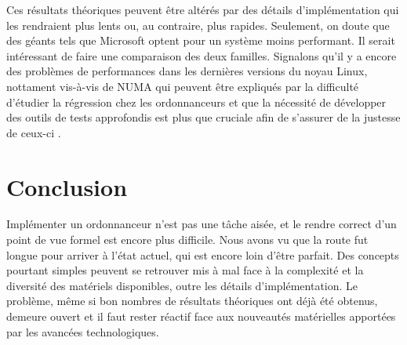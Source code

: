\documentclass[letterpaper]{article}
\begin{document}
Ces résultats théoriques peuvent être altérés par des détails d'implémentation qui les rendraient plus lents ou, au contraire, plus rapides. Seulement, on doute que des géants tels que Microsoft optent pour un système moins performant. Il serait intéressant de faire une comparaison des deux familles. Signalons qu'il y a encore des problèmes de performances dans les dernières versions du noyau Linux, nottament vis-à-vis de NUMA \citep{lozi2016linux, blagodurov2010case} qui peuvent être expliqués par la difficulté d'étudier la régression chez les ordonnanceurs \citep{chen2007keeping} et que la nécessité de développer des outils de tests approfondis est plus que cruciale afin de s'assurer de la justesse de ceux-ci \citep{erickson2010effective}.

\section{Conclusion}

Implémenter un ordonnanceur n'est pas une tâche aisée, et le rendre correct d'un point de vue formel est encore plus difficile. Nous avons vu que la route fut longue pour arriver à l'état actuel, qui est encore loin d'être parfait. Des concepts pourtant simples peuvent se retrouver mis à mal face à la complexité et la diversité des matériels disponibles, outre les détails d'implémentation. Le problème, même si bon nombres de résultats théoriques ont déjà été obtenus, demeure ouvert et il faut rester réactif face aux nouveautés matérielles apportées par les avancées technologiques.

\footnotesize


\end{document}
